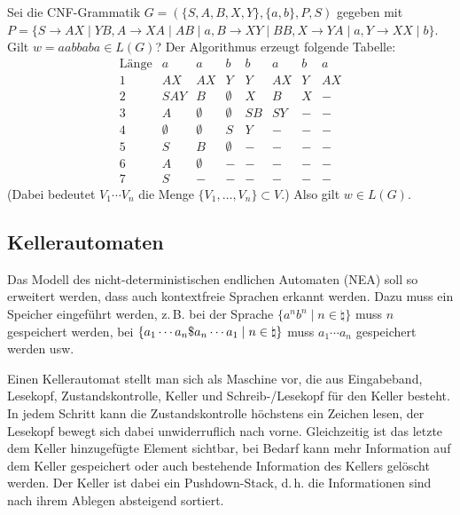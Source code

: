 \linie

\begin{Bsp}
    Sei die CNF-Grammatik $G = (\{S, A, B, X, Y\}, \{a, b\}, P, S)$
    gegeben mit\\
    $P = \{S \rightarrow AX \;|\; YB,
    A \rightarrow XA \;|\; AB \;|\; a,
    B \rightarrow XY \;|\; BB,
    X \rightarrow YA \;|\; a,
    Y \rightarrow XX \;|\; b\}$.\\
    Gilt $w = aabbaba \in L(G)$?
    Der Algorithmus erzeugt folgende Tabelle:
    \[\begin{array}{r|c|c|c|c|c|c|c}
        \text{Länge} & a & a & b & b & a & b & a \\\hline
        1 & AX & AX & Y & Y & AX & Y & AX \\\hline
        2 & SAY & B & \emptyset & X & B & X & - \\\hline
        3 & A & \emptyset & \emptyset & SB & SY & - & - \\\hline
        4 & \emptyset & \emptyset & S & Y & - & - & - \\\hline
        5 & S & B & \emptyset & - & - & - & - \\\hline
        6 & A & \emptyset & - & - & - & - & - \\\hline
        7 & S & - & - & - & - & - & -
    \end{array}\]
    (Dabei bedeutet $V_1 \dotsb V_n$ die Menge
    $\{V_1, \dotsc, V_n\} \subset V$.)
    Also gilt $w \in L(G)$.
\end{Bsp}

\pagebreak

\subsection{%
    Kellerautomaten%
}

\begin{Bem}
    Das Modell des nicht-deterministischen endlichen Automaten (NEA) soll so
    erweitert werden, dass auch kontextfreie Sprachen erkannt werden.
    Dazu muss ein Speicher eingeführt werden, z.\,B. bei der Sprache
    $\{a^n b^n \;|\; n \in \natural\}$ muss $n$ gespeichert werden,
    bei $\{a_1 \dotsb a_n \$ a_n \dotsb a_1 \;|\; n \in \natural\}$
    muss $a_1 \dotsb a_n$ gespeichert werden usw.
\end{Bem}

\begin{Bem}
    Einen Kellerautomat stellt man sich als Maschine vor, die aus
    Eingabeband, Lesekopf, Zustandskontrolle, Keller und
    Schreib-/Lesekopf für den Keller besteht.
    In jedem Schritt kann die Zustandskontrolle höchstens ein Zeichen lesen,
    der Lesekopf bewegt sich dabei unwiderruflich nach vorne.
    Gleichzeitig ist das letzte dem Keller hinzugefügte Element sichtbar,
    bei Bedarf kann mehr Information auf dem Keller gespeichert oder
    auch bestehende Information des Kellers gelöscht werden.
    Der Keller ist dabei ein Pushdown-Stack, d.\,h. die Informationen sind
    nach ihrem Ablegen absteigend sortiert.
\end{Bem}

